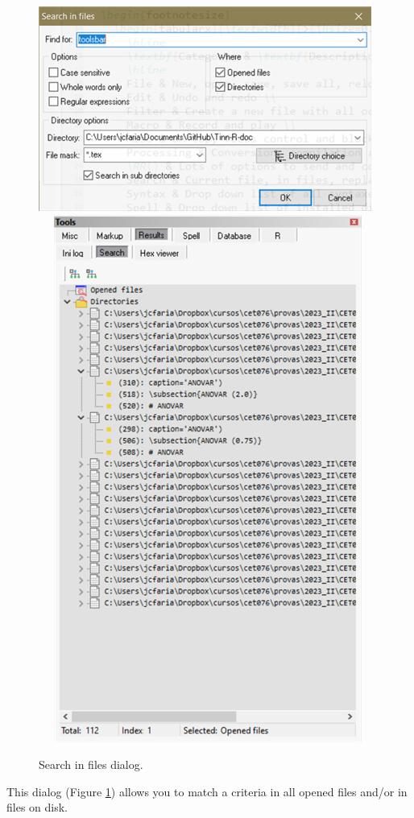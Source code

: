 \begin{figure}[H]
  \includegraphics[scale=0.50]{./res/dlg_search_in_files.png}~~
  \includegraphics[scale=0.35]{./res/tools_results_search.png}\\
  \caption{Search in files dialog.}
  \label{fig:dlg_search_in_files}
\end{figure}
This dialog
(Figure \ref{fig:dlg_search_in_files})
allows you to match a criteria in all opened files and/or in files on disk.

